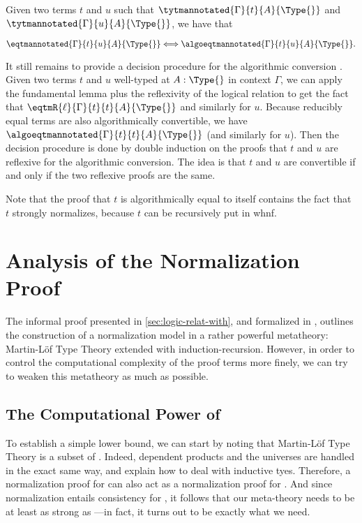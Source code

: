 \begin{theorem}
  \label{thm:algoconv}
    Given two terms $t$ and $u$ such that
    $\tytmannotated{\Gamma}{t}{A}{\Type{}}$ and
    $\tytmannotated{\Gamma}{u}{A}{\Type{}}$, we have that

    $$ \eqtmannotated{\Gamma}{t}{u}{A}{\Type{}} \Longleftrightarrow\algoeqtmannotated{\Gamma}{t}{u}{A}{\Type{}}.$$
\end{theorem}

It still remains to provide a decision procedure for the algorithmic
conversion .
%
Given two terms $t$ and $u$ well-typed at $A : \Type{}$ in context
$\Gamma$, we can apply the fundamental lemma plus the reflexivity of
the logical relation to get the fact that $\eqtmR{\ell}{\Gamma}{t}{t}{A}{\Type{}}$
and similarly for $u$.
%
Because reducibly equal terms are also algorithmically convertible, we
have $\algoeqtmannotated{\Gamma}{t}{t}{A}{\Type{}}$ (and similarly for $u$).
%
Then the decision procedure is done by double induction on the proofs
that $t$ and $u$ are reflexive for the algorithmic conversion.
%
The idea is that $t$ and $u$ are convertible if and only if the two reflexive proofs are the same.

Note that the proof that $t$ is algorithmically equal to itself
contains the fact that $t$ strongly normalizes, because
$t$ can be recursively put in whnf.

\section{Analysis of the Normalization Proof}
\label{sec:analys-norm-proof}

The informal proof presented in \cref{sec:logic-relat-with}, and
formalized in \Agda, outlines the construction of a normalization
model in a rather powerful metatheory: Martin-Löf Type Theory extended
with induction-recursion.
%
However, in order to control the computational complexity of the proof terms
more finely, we can try to weaken this metatheory as much as possible.

\subsection{The Computational Power of \SetoidCC}

To establish a simple lower bound, we can start by noting that Martin-Löf
Type Theory is a subset of \SetoidCC. Indeed, dependent products and
the universes are handled in the exact same way, and  explain
how to deal with inductive tyes.
%
Therefore, a normalization proof for \SetoidCC can also act as a
normalization proof for \MLTT.
%
And since normalization entails consistency for \MLTT, it follows that our
meta-theory needs to be at least as strong as \MLTT---in fact, it turns out to be exactly what we need.

